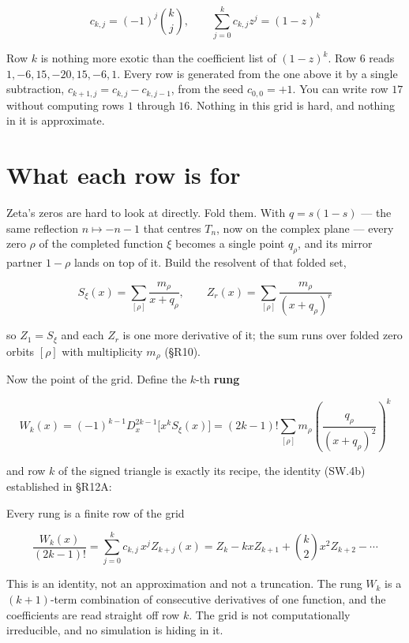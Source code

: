 \documentclass[
  11pt,
]{book}
\begin{document}
\[
\boxed{c_{k,j}=(-1)^j\binom{k}{j}},
\qquad
\sum_{j=0}^{k}c_{k,j}z^{j}=(1-z)^{k}
\tag{R.1b}
\]

Row \(k\) is nothing more exotic than the coefficient list of
\((1-z)^k\). Row \(6\) reads \(1,-6,15,-20,15,-6,1\). Every row is
generated from the one above it by a single subtraction,
\(c_{k+1,j}=c_{k,j}-c_{k,j-1}\), from the seed \(c_{0,0}=+1\). You can
write row \(17\) without computing rows \(1\) through \(16\). Nothing in
this grid is hard, and nothing in it is approximate.

\section{What each row is for}\label{what-each-row-is-for}

Zeta's zeros are hard to look at directly. Fold them. With \(q=s(1-s)\)
--- the same reflection \(n\mapsto -n-1\) that centres \(T_n\), now on
the complex plane --- every zero \(\rho\) of the completed function
\(\xi\) becomes a single point \(q_\rho\), and its mirror partner
\(1-\rho\) lands on top of it. Build the resolvent of that folded set,

\[
S_\xi(x)=\sum_{[\rho]}\frac{m_\rho}{x+q_\rho},
\qquad
Z_r(x)=\sum_{[\rho]}\frac{m_\rho}{(x+q_\rho)^{r}}
\tag{R.1c}
\]

so \(Z_1=S_\xi\) and each \(Z_r\) is one more derivative of it; the sum
runs over folded zero orbits \([\rho]\) with multiplicity \(m_\rho\)
(§R10).

Now the point of the grid. Define the \(k\)-th \textbf{rung}

\[
\boxed{
W_k(x)=(-1)^{k-1}D_x^{2k-1}\bigl[x^{k}S_\xi(x)\bigr]
=(2k-1)!\sum_{[\rho]}m_\rho
\left(\frac{q_\rho}{(x+q_\rho)^{2}}\right)^{k}}
\tag{R.3}
\]

and row \(k\) of the signed triangle is exactly its recipe, the identity
(SW.4b) established in §R12A:

\begin{tnclosed}{Every rung is a finite row of the grid}

\[
\frac{W_k(x)}{(2k-1)!}
=\sum_{j=0}^{k}c_{k,j}\,x^{j}Z_{k+j}(x)
=Z_k-kxZ_{k+1}+\binom{k}{2}x^{2}Z_{k+2}-\cdots
\]

\end{tnclosed}

This is an identity, not an approximation and not a truncation. The rung
\(W_k\) is a \((k+1)\)-term combination of consecutive derivatives of
one function, and the coefficients are read straight off row \(k\). The
grid is not computationally irreducible, and no simulation is hiding in
it.
\end{document}
